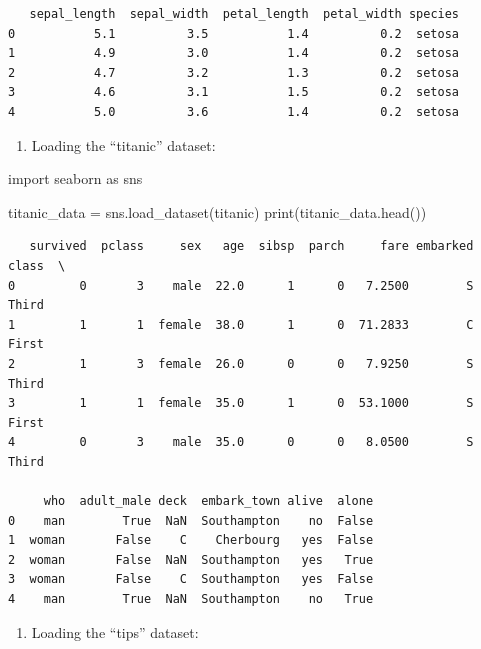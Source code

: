 \documentclass[
  english,
  letterpaper,
  DIV=11,
  numbers=noendperiod]{scrreprt}
\newenvironment{Shaded}{\begin{snugshade}}{\end{snugshade}}
\newcommand{\BuiltInTok}[1]{\textcolor[rgb]{0.00,0.23,0.31}{#1}}
\newcommand{\ImportTok}[1]{\textcolor[rgb]{0.00,0.46,0.62}{#1}}
\newcommand{\NormalTok}[1]{\textcolor[rgb]{0.00,0.23,0.31}{#1}}
\newcommand{\OperatorTok}[1]{\textcolor[rgb]{0.37,0.37,0.37}{#1}}
\newcommand{\StringTok}[1]{\textcolor[rgb]{0.13,0.47,0.30}{#1}}
\providecommand{\tightlist}{%
  \setlength{\itemsep}{0pt}\setlength{\parskip}{0pt}}
\begin{document}
\begin{verbatim}
   sepal_length  sepal_width  petal_length  petal_width species
0           5.1          3.5           1.4          0.2  setosa
1           4.9          3.0           1.4          0.2  setosa
2           4.7          3.2           1.3          0.2  setosa
3           4.6          3.1           1.5          0.2  setosa
4           5.0          3.6           1.4          0.2  setosa
\end{verbatim}

\begin{enumerate}
\def\labelenumi{\arabic{enumi}.}
\setcounter{enumi}{1}
\tightlist
\item
  Loading the ``titanic'' dataset:
\end{enumerate}

\begin{Shaded}
\begin{Highlighting}[]
\ImportTok{import}\NormalTok{ seaborn }\ImportTok{as}\NormalTok{ sns}

\NormalTok{titanic\_data }\OperatorTok{=}\NormalTok{ sns.load\_dataset(}\StringTok{\textquotesingle{}titanic\textquotesingle{}}\NormalTok{)}
\BuiltInTok{print}\NormalTok{(titanic\_data.head())}
\end{Highlighting}
\end{Shaded}

\begin{verbatim}
   survived  pclass     sex   age  sibsp  parch     fare embarked  class  \
0         0       3    male  22.0      1      0   7.2500        S  Third   
1         1       1  female  38.0      1      0  71.2833        C  First   
2         1       3  female  26.0      0      0   7.9250        S  Third   
3         1       1  female  35.0      1      0  53.1000        S  First   
4         0       3    male  35.0      0      0   8.0500        S  Third   

     who  adult_male deck  embark_town alive  alone  
0    man        True  NaN  Southampton    no  False  
1  woman       False    C    Cherbourg   yes  False  
2  woman       False  NaN  Southampton   yes   True  
3  woman       False    C  Southampton   yes  False  
4    man        True  NaN  Southampton    no   True  
\end{verbatim}

\begin{enumerate}
\def\labelenumi{\arabic{enumi}.}
\setcounter{enumi}{2}
\tightlist
\item
  Loading the ``tips'' dataset:
\end{enumerate}
\end{document}
